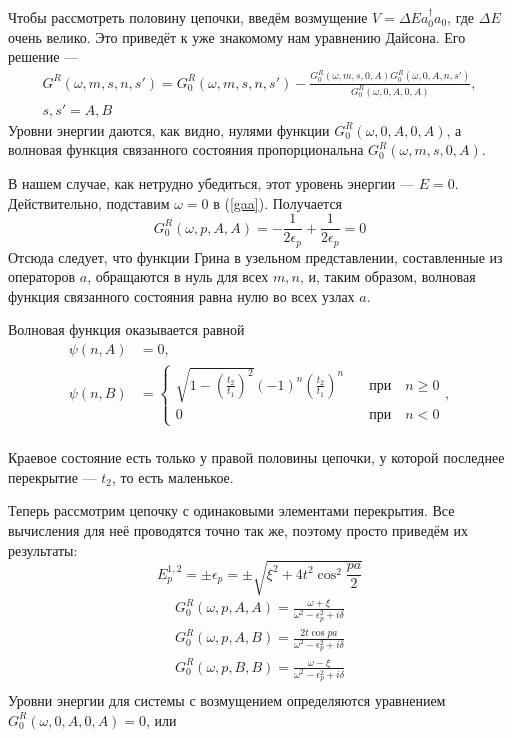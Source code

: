 Чтобы рассмотреть половину цепочки, введём возмущение 
$V = \Delta E a_0^\dagger a_0$, где $\Delta E$ очень велико.
Это приведёт к уже знакомому нам уравнению Дайсона. Его решение --- 
\begin{multline}
	G^R(\omega, m, s, n, s') = 
		G^R_0(\omega, m,s,n,s') - 
		\frac{G^R_0(\omega, m, s, 0, A)G^R_0(\omega, 0, A, n, s')}{G^R_0(\omega, 0, A, 0, A)},\\
		s,s' = A,B
\end{multline}
Уровни энергии даются, как видно, нулями функции $G^R_0(\omega, 0,A,0,A)$, а волновая функция
связанного состояния пропорциональна $G^R_0(\omega, m,s,0,A)$.

В нашем случае, как нетрудно убедиться, этот уровень энергии --- $E = 0$. Действительно, подставим 
$\omega = 0$ в (\ref{gaa}). Получается
\begin{equation}
	G^R_0 (\omega, p, A, A) = 
		-\frac{1}{2\epsilon_p} + 
					\frac{1}{2\epsilon_p} = 0
\end{equation}
Отсюда следует, что функции Грина в узельном представлении, 
составленные из операторов $a$, обращаются в нуль для всех $m,n$, и, таким образом, волновая 
функция связанного состояния равна нулю во всех узлах $a$. 

Волновая функция оказывается равной 
\begin{equation}
	\begin{split}
	\psi(n,A) &  = 0, \\
	\psi(n, B) & = 
	\left\{
	\begin{matrix}
		{\displaystyle
 		\sqrt{1 - \left(\frac{t_2}{t_1}\right)^2}(-1)^n \left(\frac{t_2}{t_1}\right)^n}
									&	\quad \mbox{при} \quad n \ge 0 \\
		0 & \quad \mbox{при} \quad n < 0
	\end{matrix}
	\right.,\\
	\end{split}
\end{equation}

Краевое состояние есть только у правой половины цепочки, у которой последнее перекрытие --- 
$t_2$, то есть маленькое.

Теперь рассмотрим цепочку с одинаковыми элементами перекрытия. Все вычисления для неё
проводятся точно так же, поэтому просто приведём их результаты:
\begin{equation}
	E_p^{1,2} = \pm \epsilon_p = \pm \sqrt{\xi^2 + 4t^2 \cos^2{\frac{pa}{2}}}
\end{equation}
\begin{equation}
	\begin{split}
	G_0^R(\omega, p, A, A) = \frac{\omega + \xi}{\omega^2 - \epsilon_p^2 + i\delta}\\
	G_0^R(\omega, p, A, B) = \frac{2t\cos{pa}}{\omega^2 - \epsilon_p^2 + i\delta}\\
	G_0^R(\omega, p, B, B) = \frac{\omega - \xi}{\omega^2 - \epsilon_p^2 + i\delta}\\
	\end{split}
\end{equation}
Уровни энергии для системы с возмущением 
определяются уравнением $G_0^R(\omega,0,A,0,A) = 0$, или 
{\sloppy

}


